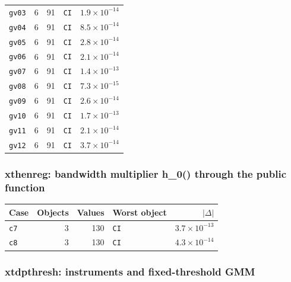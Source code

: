 \documentclass[
  10.5pt,
  a4paper,
]{article}
\begin{document}
\begin{longtable}{@{}p{3.6cm}rrp{4.9cm}r@{}}
\texttt{gv03} & 6 & 91 & \texttt{CI} & $1.9\times10^{-14}$ \\
\texttt{gv04} & 6 & 91 & \texttt{CI} & $8.5\times10^{-14}$ \\
\texttt{gv05} & 6 & 91 & \texttt{CI} & $2.8\times10^{-14}$ \\
\texttt{gv06} & 6 & 91 & \texttt{CI} & $2.1\times10^{-14}$ \\
\texttt{gv07} & 6 & 91 & \texttt{CI} & $1.4\times10^{-13}$ \\
\texttt{gv08} & 6 & 91 & \texttt{CI} & $7.3\times10^{-15}$ \\
\texttt{gv09} & 6 & 91 & \texttt{CI} & $2.6\times10^{-14}$ \\
\texttt{gv10} & 6 & 91 & \texttt{CI} & $1.7\times10^{-13}$ \\
\texttt{gv11} & 6 & 91 & \texttt{CI} & $2.1\times10^{-14}$ \\
\texttt{gv12} & 6 & 91 & \texttt{CI} & $3.7\times10^{-14}$ \\
\bottomrule
\end{longtable}

\subsubsection*{xthenreg: bandwidth multiplier h\_0() through the public function}

\begin{longtable}{@{}p{3.6cm}rrp{4.9cm}r@{}}
\toprule
Case & Objects & Values & Worst object & $|\Delta|$ \\
\midrule
\endhead
\texttt{c7} & 3 & 130 & \texttt{CI} & $3.7\times10^{-13}$ \\
\texttt{c8} & 3 & 130 & \texttt{CI} & $4.3\times10^{-14}$ \\
\bottomrule
\end{longtable}

\subsubsection*{xtdpthresh: instruments and fixed-threshold GMM}
\end{document}
